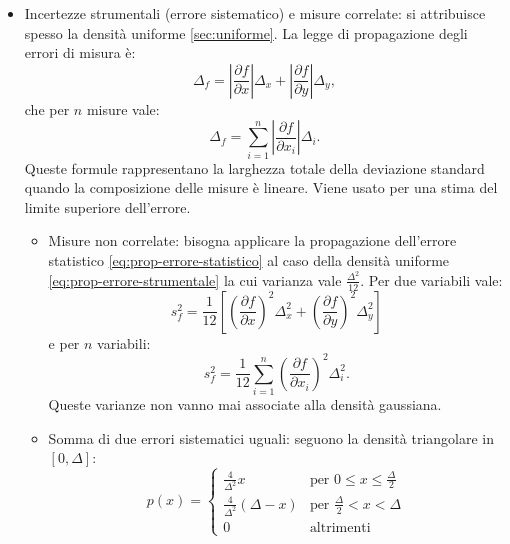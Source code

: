 \begin{itemize}
\begin{itemize}
\begin{equation}
\end{equation}
\end{itemize}
\item Incertezze strumentali (errore sistematico) e misure correlate: si attribuisce spesso la densità uniforme \ref{sec:uniforme}. La legge di propagazione degli errori di misura è:
\begin{equation}
\label{eq:prop-errore-strumentale}
{ \Delta  }_{ f }=\left| \frac { \partial f }{ \partial x }  \right| { \Delta  }_{ x }+\left| \frac { \partial f }{ \partial y }  \right| { \Delta  }_{ y },
\end{equation}
che per $n$ misure vale:
\begin{equation}
{ \Delta  }_{ f }=\sum _{ i=1 }^{ n }{ \left| \frac { \partial f }{ \partial { x }_{ i } }  \right| { \Delta  }_{ i } } .
\end{equation}
Queste formule rappresentano la larghezza totale della deviazione standard quando la composizione delle misure è lineare. Viene usato per una stima del limite superiore dell'errore.
\begin{itemize}
\item Misure non correlate: bisogna applicare la propagazione dell'errore statistico \ref{eq:prop-errore-statistico} al caso della densità uniforme \ref{eq:prop-errore-strumentale} la cui varianza vale $\frac{\Delta^2}{12}$. Per due variabili vale:
\begin{equation}
\label{eq:prop-mis-non-correlate}
{ s }_{ f }^{ 2 }=\frac { 1 }{ 12 } \left[ { \left( \frac { \partial f }{ \partial x }  \right)  }^{ 2 }{ \Delta  }_{ x }^{ 2 }+{ \left( \frac { \partial f }{ \partial y }  \right)  }^{ 2 }{ \Delta  }_{ y }^{ 2 } \right] 
\end{equation}
e per $n$ variabili:
\begin{equation}
{ s }_{ f }^{ 2 }=\frac { 1 }{ 12 } \sum _{ i=1 }^{ n }{ { \left( \frac { \partial f }{ \partial { x }_{ i } }  \right)  }^{ 2 }{ \Delta  }_{ i }^{ 2 } } .
\end{equation}
Queste varianze non vanno mai associate alla densità gaussiana.
\item Somma di due errori sistematici uguali: seguono la densità triangolare in $[0,\Delta]$:
\begin{equation}
p(x)= \begin{cases}
\frac { 4 }{ \Delta^2 }x & \textrm{per } 0\le x\le \frac{\Delta}{2}\\ \frac { 4 }{ \Delta^2 }\left( {\Delta - x} \right) & \textrm{per } \frac{\Delta}{2}<x <\Delta \\ 0 & \textrm{altrimenti}

\end{cases}
\end{equation}
\end{itemize}
\end{itemize}
